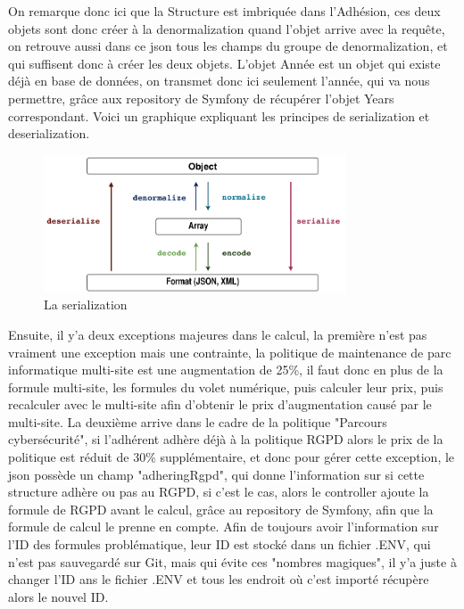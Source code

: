 \documentclass[a4paper,12pt]{report}
\begin{document}
On remarque donc ici que la Structure est imbriquée dans l'Adhésion, ces deux objets sont donc créer à la denormalization quand l'objet arrive avec la requête, on retrouve aussi dans ce json tous les champs du groupe de denormalization, et qui suffisent donc à créer les deux objets. L'objet Année est un objet qui existe déjà en base de données, on transmet donc ici seulement l'année, qui va nous permettre, grâce aux repository de Symfony de récupérer l'objet Years correspondant. Voici un graphique expliquant les principes de serialization et deserialization.

\begin{figure}[h]
    \centering
    \includegraphics[width=0.8\textwidth]{SerializerWorkflow.png}
    \caption{La serialization}
    \label{fig:serialization}
\end{figure}

Ensuite, il y'a deux exceptions majeures dans le calcul, la première n'est pas vraiment une exception mais une contrainte, la politique de maintenance de parc informatique multi-site est une augmentation de 25\%, il faut donc en plus de la formule multi-site, les formules du volet numérique, puis calculer leur prix, puis recalculer avec le multi-site afin d'obtenir le prix d'augmentation causé par le multi-site. La deuxième arrive dans le cadre de la politique "Parcours cybersécurité", si l'adhérent adhère déjà à la politique RGPD alors le prix de la politique est réduit de 30\% supplémentaire, et donc pour gérer cette exception, le json possède un champ "adheringRgpd", qui donne l'information sur si cette structure adhère ou pas au RGPD, si c'est le cas, alors le controller ajoute la formule de RGPD avant le calcul, grâce au repository de Symfony, afin que la formule de calcul le prenne en compte. Afin de toujours avoir l'information sur l'ID des formules problématique, leur ID est stocké dans un fichier .ENV, qui n'est pas sauvegardé sur Git, mais qui évite ces "nombres magiques", il y'a juste à changer l'ID ans le fichier .ENV et tous les endroit où c'est importé récupère alors le nouvel ID.
\end{document}
